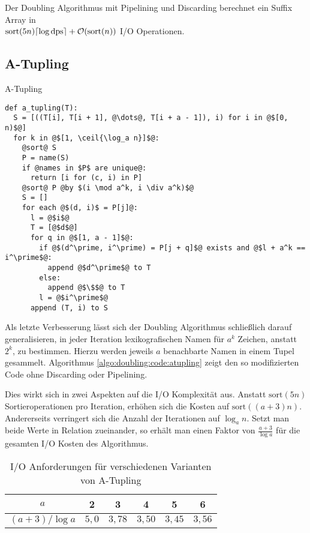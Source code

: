 \begin{theorem}
Der Doubling Algorithmus mit Pipelining und Discarding berechnet ein Suffix Array in\\ $\text{sort}(5n) \ceil*{\log \text{dps}} +  \mathcal{O}(\text{sort}(n))$ I/O Operationen.
\end{theorem}

\subsection{A-Tupling}
\label{algo:doubling:sec:tupling}
\begin{listing}[htp]
\caption{A-Tupling} 
\label{algo:doubling:code:atupling}
\begin{verbatim}
def a_tupling(T):
  S = [((T[i], T[i + 1], @\dots@, T[i + a - 1]), i) for i in @$[0, n)$@]
  for k in @$[1, \ceil{\log_a n}]$@:
    @sort@ S
    P = name(S)
    if @names in $P$ are unique@:
      return [i for (c, i) in P]
    @sort@ P @by $(i \mod a^k, i \div a^k)$@
    S = []
    for each @$(d, i)$ = P[j]@:
      l = @$i$@
      T = [@$d$@]
      for q in @$[1, a - 1]$@:
        if @$(d^\prime, i^\prime) = P[j + q]$@ exists and @$l + a^k == i^\prime$@:
          append @$d^\prime$@ to T
        else:
          append @$\$$@ to T
        l = @$i^\prime$@
      append (T, i) to S
\end{verbatim}
\end{listing}

Als letzte Verbesserung lässt sich der Doubling Algorithmus schließlich darauf generalisieren, in jeder Iteration lexikografischen Namen für $a^k$ Zeichen, anstatt $2^k$, zu bestimmen. Hierzu werden jeweils $a$ benachbarte Namen in einem Tupel gesammelt. Algorithmus \ref{algo:doubling:code:atupling} zeigt den so modifizierten Code ohne Discarding oder Pipelining.

Dies wirkt sich in zwei Aspekten auf die I/O Komplexität aus. Anstatt $\text{sort}(5n)$ Sortieroperationen pro Iteration, erhöhen sich die Kosten auf $\text{sort}((a+3)n)$. Andererseits verringert sich die Anzahl der Iterationen auf $\log_a n$. Setzt man beide Werte in Relation zueinander, so erhält man einen Faktor von $\frac{a + 3}{\log a}$ für die gesamten I/O Kosten des Algorithmus. 

\begin{table}
\caption{I/O Anforderungen für verschiedenen Varianten von A-Tupling}
\label{algo:doubling:tab:tab1}
\centering
\begin{tabular}{cccccc}
\toprule
$a$ & 2 & 3 & 4 & 5 & 6 \\ 
\midrule 
$(a+3) / \log a$ & $5,0$ & $3,78$ & $3,50$ & $3,45$ & $3,56$ \\ 
\bottomrule
\end{tabular} 
\end{table}

